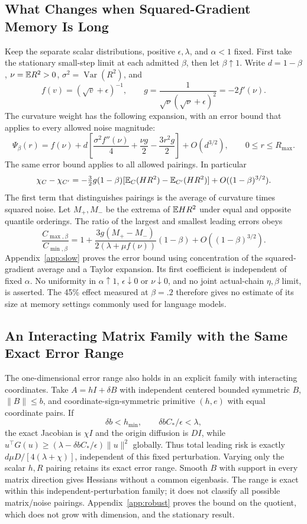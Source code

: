 \subsection{What Changes when Squared-Gradient Memory Is Long}
Keep the separate scalar distributions, positive $\epsilon,\lambda$, and $\alpha<1$ fixed.
First take the stationary small-step limit at each admitted $\beta$, then
let $\beta\uparrow1$. Write $d=1-\beta$, $\nu=\mathbb E R^2>0$,
$\sigma^2=\operatorname{Var}(R^2)$, and
\[
 f(v)=(\sqrt v+\epsilon)^{-1},\qquad
 g=\frac1{\sqrt\nu(\sqrt\nu+\epsilon)^2}=-2f'(\nu).
\]
The curvature weight has the following expansion, with an error bound
that applies to every allowed noise magnitude:
\begin{equation}\label{eq:slow-kernel}
 \Psi_\beta(r)=f(\nu)+d\left[
 \frac{\sigma^2f''(\nu)}4+\frac{\nu g}2-\frac{3r^2g}2\right]
 +O(d^{3/2}),\qquad 0\leq r\leq R_{\max}.
\end{equation}
The same error bound applies to all allowed pairings. In particular
\[
 \chi_C-\chi_{C'}=-\tfrac32g(1-\beta)
  [\mathbb E_C(HR^2)-\mathbb E_{C'}(HR^2)]+O((1-\beta)^{3/2}).
\]
The first term that distinguishes pairings is the average of curvature
times squared noise.
Let $M_+,M_-$ be the extrema of $\mathbb E HR^2$ under equal and opposite
quantile orderings.
The ratio of the largest and smallest leading errors obeys
\begin{equation}\label{eq:slow-spread}
 \frac{C_{\max,\beta}}{C_{\min,\beta}}
 =1+\frac{3g(M_+-M_-)}{2(\lambda+\mu f(\nu))}(1-\beta)
       +O((1-\beta)^{3/2}).
\end{equation}
Appendix~\ref{app:slow} proves the error bound using concentration of the
squared-gradient average and a Taylor expansion. Its first coefficient is independent
of fixed $\alpha$. No uniformity in $\alpha\uparrow1$, $\epsilon\downarrow0$
or $\nu\downarrow0$, and no joint actual-chain $\eta,\beta$ limit, is
asserted. The 45\% effect measured at $\beta=.2$ therefore gives no estimate
of its size at memory settings commonly used for language models.

\subsection{An Interacting Matrix Family with the Same Exact Error Range}
The one-dimensional error range also holds in an explicit family with
interacting coordinates.
Take $A=hI+\delta B$ with independent centered bounded symmetric $B$,
$\|B\|\leq b$, and coordinate-sign-symmetric primitive $(h,e)$ with equal
coordinate pairs. If
\[
 \delta b<h_{\min},\qquad \delta bC_*/\epsilon<\lambda,
\]
the exact Jacobian is $\chi I$ and the origin diffusion is $DI$, while
$u^\top G(u)\geq(\lambda-\delta bC_*/\epsilon)\|u\|^2$ globally.
Thus total leading risk is exactly $d\mu D/[4(\lambda+\chi)]$,
independent of this fixed perturbation. Varying only the scalar $h,R$
pairing retains its exact error range. Smooth $B$ with support in every
matrix direction gives Hessians without a common eigenbasis. The range is
exact within this independent-perturbation family; it does not classify all
possible matrix/noise pairings. Appendix~\ref{app:robust} proves the bound
on the quotient, which does not grow with dimension, and the stationary result.

